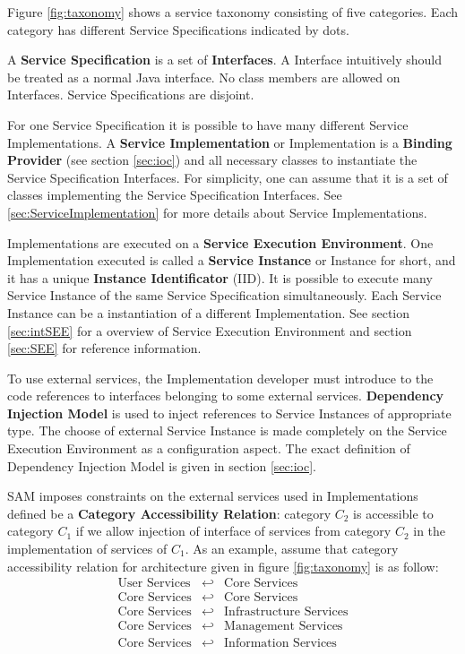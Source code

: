 Figure \ref{fig:taxonomy} shows a service taxonomy consisting of five categories. Each category has different Service Specifications indicated by dots.

A \textbf{Service Specification} is a set of \textbf{Interfaces}. A Interface intuitively should be treated as a normal Java interface. No class members are allowed on Interfaces. Service Specifications are disjoint.

For one Service Specification it is possible to have many different Service Implementations. A \textbf{Service Implementation} or Implementation is a \textbf{Binding Provider} (see section \ref{sec:ioc}) and all necessary classes to instantiate the Service Specification Interfaces. For simplicity, one can assume that it is a set of classes implementing the Service Specification Interfaces. See \ref{sec:ServiceImplementation} for more details about Service Implementations.

Implementations are executed on a \textbf{Service Execution Environment}. One Implementation executed is called a \textbf{Service Instance} or Instance for short, and it has a unique \textbf{Instance Identificator} (IID). It is possible to execute many Service Instance of the same Service Specification simultaneously. Each Service Instance can be a instantiation of a different Implementation. See section \ref{sec:intSEE} for a overview of Service Execution Environment and section \ref{sec:SEE} for reference information.

To use external services, the Implementation developer must introduce to the code references to interfaces belonging to some external services. \textbf{Dependency Injection Model} is used to inject references to  Service Instances of appropriate type. The choose of  external Service Instance is made completely on the Service Execution Environment as a configuration aspect. The exact definition of Dependency Injection Model is given in section \ref{sec:ioc}.

SAM imposes constraints on the external services used in Implementations defined be a \textbf{Category Accessibility Relation}:  category $C_2$ is accessible to category $C_1$ if we allow injection of interface of services from category $C_2$ in the implementation of services of $C_1$. As an example, assume that category accessibility relation for architecture given in figure \ref{fig:taxonomy} is as follow:
\begin{eqnarray}
\text{User Services} &\hookleftarrow & \text{Core Services} \nonumber \\
\text{Core Services} &\hookleftarrow& \text{Core Services} \nonumber \\
\text{Core Services} &\hookleftarrow& \text{Infrastructure Services} \nonumber \\
\text{Core Services} &\hookleftarrow& \text{Management Services} \nonumber \\
\text{Core Services} &\hookleftarrow& \text{Information Services} \nonumber 
\end{eqnarray}

